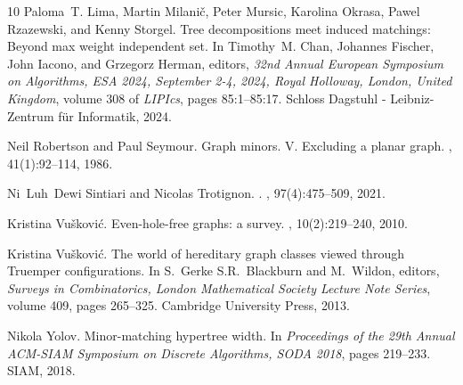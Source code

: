 \documentclass[11pt]{article}
\theoremstyle{definition}
\theoremstyle{definition}
\begin{document}
\begin{thebibliography}{10}
Paloma~T. Lima, Martin Milani{\v c}, Peter Mursic, Karolina Okrasa, Pawel
  Rzazewski, and Kenny Storgel.
\newblock Tree decompositions meet induced matchings: Beyond max weight
  independent set.
\newblock In Timothy~M. Chan, Johannes Fischer, John Iacono, and Grzegorz
  Herman, editors, {\em 32nd Annual European Symposium on Algorithms, {ESA}
  2024, September 2-4, 2024, Royal Holloway, London, United Kingdom}, volume
  308 of {\em LIPIcs}, pages 85:1--85:17. Schloss Dagstuhl - Leibniz-Zentrum
  f{\"{u}}r Informatik, 2024.


Neil Robertson and Paul Seymour.
\newblock Graph minors. {V}. {E}xcluding a planar graph.
, 41(1):92--114,
  1986.

Ni~Luh~Dewi Sintiari and Nicolas Trotignon.
.
, 97(4):475--509, 2021.

Kristina Vu{\v s}kovi{\'c}.
\newblock Even-hole-free graphs: a survey.
, 10(2):219--240,
  2010.

  
Kristina Vu{\v s}kovi{\'c}.
\newblock The world of hereditary graph classes viewed through {T}ruemper
  configurations.
\newblock In S.~Gerke S.R.~Blackburn and M.~Wildon, editors, {\em Surveys in
  Combinatorics, London Mathematical Society Lecture Note Series}, volume 409,
  pages 265--325. Cambridge University Press, 2013.

Nikola Yolov.
\newblock Minor-matching hypertree width.
\newblock In {\em Proceedings of the 29th Annual {ACM-SIAM} Symposium on
  Discrete Algorithms, {SODA} 2018}, pages 219--233. {SIAM}, 2018.

\end{thebibliography}
\end{document}
